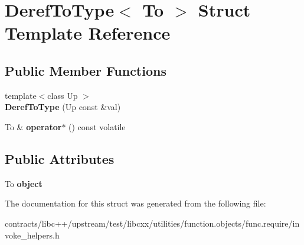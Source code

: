 \hypertarget{struct_deref_to_type}{}\section{Deref\+To\+Type$<$ To $>$ Struct Template Reference}
\label{struct_deref_to_type}
\subsection*{Public Member Functions}
\begin{DoxyCompactItemize}
\item 
\mbox{\label{struct_deref_to_type_a1c3105b0b028874f07100a77d4c4ceb7}} 
{\footnotesize template$<$class Up $>$ }\\{\bfseries Deref\+To\+Type} (Up const \&val)
\item 
\mbox{\label{struct_deref_to_type_a4c08063f1de7e69f2b148ba7c8b55dd3}} 
To \& {\bfseries operator$\ast$} () const volatile
\end{DoxyCompactItemize}
\subsection*{Public Attributes}
\begin{DoxyCompactItemize}
\item 
\mbox{\label{struct_deref_to_type_aef1568dc5d0532354aa8f8435b458b25}} 
To {\bfseries object}
\end{DoxyCompactItemize}


The documentation for this struct was generated from the following file\+:\begin{DoxyCompactItemize}
\item 
contracts/libc++/upstream/test/libcxx/utilities/function.\+objects/func.\+require/invoke\+\_\+helpers.\+h\end{DoxyCompactItemize}
